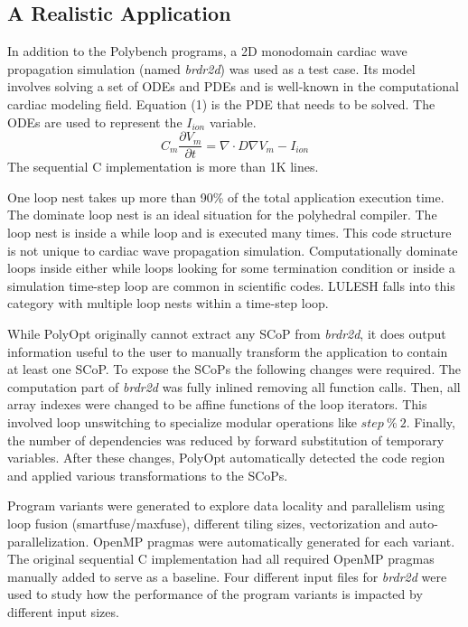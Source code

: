 \subsection{A Realistic Application}
In addition to the Polybench programs, a 2D monodomain cardiac wave propagation simulation 
(named \emph{brdr2d}) was used as a test case. Its model involves
solving a set of ODEs and PDEs and is well-known in the computational 
cardiac modeling field\cite{Me}. Equation (1) is the PDE that needs to be 
solved. The ODEs are used to represent the $I_{ion}$ variable.
\begin{equation}
C_{m}\frac{\partial V_{m}}{\partial t} = \nabla \cdot D\nabla{V_{m}}-I_{ion}
\end{equation}
The sequential C implementation is more than 1K lines. 

One loop nest takes up more than 90\% of the total application execution time. 
The dominate loop nest is an ideal situation for the polyhedral compiler. 
The loop nest is inside a while loop and is executed many times. 
This code structure is not unique to cardiac wave propagation simulation. 
Computationally dominate loops inside either while loops looking for 
some termination condition or inside a simulation time-step loop
are common in scientific codes. LULESH falls into this category
with multiple loop nests within a time-step loop.

While PolyOpt originally cannot extract any SCoP from \emph{brdr2d}, it does output
information useful to the user to manually transform the application to contain at least one SCoP.
To expose the SCoPs the following changes were required. The computation part 
of \emph{brdr2d} was fully inlined removing all function calls.
Then, all array indexes were changed to be affine functions of the 
loop iterators. This involved loop unswitching to specialize modular operations
like $step~\%~2$. Finally, the number of dependencies was reduced by forward substitution
of temporary variables. After these changes, PolyOpt automatically detected the code
region and applied various transformations to the SCoPs. 


Program variants were generated to explore data locality and parallelism
using loop fusion (smartfuse/maxfuse), different tiling sizes, vectorization and auto-parallelization. 
OpenMP pragmas were automatically generated for each variant.
The original sequential C implementation had all required OpenMP pragmas manually added to serve as
a baseline.
Four different input files for \emph{brdr2d} were used to study how the
performance of the program variants is impacted by different
input sizes. 
 
